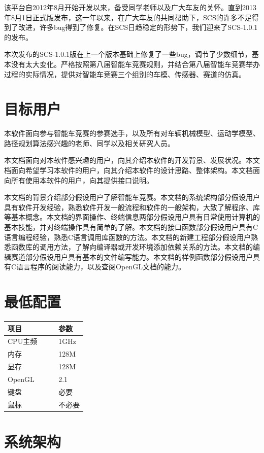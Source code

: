 \documentclass[titlepage,a4paper]{ctexart}
\begin{document}
该平台自2012年8月开始开发以来，备受同学老师以及广大车友的关怀。直到2013年8月1日正式版发布，这一年以来，在广大车友的共同帮助下，SCS的许多不足得到了改进，许多bug得到了修复。在SCS日趋稳定的形势下，我们迎来了SCS-1.0.1的发布。

本次发布的SCS-1.0.1版在上一个版本基础上修复了一些bug，调节了少数细节，基本没有太大变化。严格按照第八届智能车竞赛规则，并结合第八届智能车竞赛举办过程的实际情况，提供对智能车竞赛三个组别的车模、传感器、赛道的仿真。

\section{目标用户}
本软件面向参与智能车竞赛的参赛选手，以及所有对车辆机械模型、运动学模型、路径规划算法感兴趣的老师、同学以及相关研究人员。

本文档面向对本软件感兴趣的用户，向其介绍本软件的开发背景、发展状况。本文档面向希望学习本软件的用户，向其介绍本软件的设计思路、整体架构。本文档面向所有使用本软件的用户，向其提供接口说明。

本文档的背景介绍部分假设用户了解智能车竞赛。本文档的系统架构部分假设用户具有软件开发经验，熟悉软件开发一般流程和软件的一般架构，大致了解程序、库等基本概念。本文档的界面操作、终端信息两部分假设用户具有日常使用计算机的基本技能，并对终端操作具有简单的了解。本文档的接口函数部分假设用户具有C语言编程经验，熟悉C语言调用库函数的方法。本文档的新建工程部分假设用户熟悉函数库的调用方法，了解向编译器或开发环境添加依赖关系的方法。本文档的编辑赛道部分假设用户具有基本的文件编写能力。本文档的样例函数部分假设用户具有C语言程序的阅读能力，以及查阅OpenGL文档的能力。


\section{最低配置}
\begin{center}
\begin{tabular}{lll}
\hline
项目	&　& 参数 \\
\hline
CPU主频	& & 1GHz \\
内存	& & 128M \\
显存	& & 128M \\
OpenGL	& & 2.1  \\
键盘	& & 必要 \\
鼠标	& & 不必要 \\
\hline
\end{tabular}
\end{center}

\section{系统架构}
\end{document}
